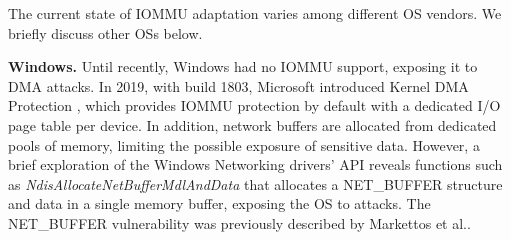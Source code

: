 
The current state of IOMMU adaptation varies among different OS vendors. We briefly discuss other OSs below.

\smallskip
\noindent\textbf{Windows.} Until recently, Windows had no IOMMU support, exposing it to \simple DMA attacks.
In 2019, with build 1803, Microsoft introduced Kernel DMA Protection \cite{ms_iommu}, which provides IOMMU protection by default with a dedicated I/O page table per device. 
In addition, network buffers are allocated from dedicated pools of memory, limiting the possible exposure of sensitive data. However, a brief exploration of the Windows Networking drivers' API reveals functions such as \emph{NdisAllocateNetBufferMdlAndData} \cite{ms_single} that allocates a NET\_BUFFER structure and data in a single memory buffer, exposing the OS to \simple attacks. 
The NET\_BUFFER vulnerability was previously described by Markettos et al.\cite{thunder}. 

